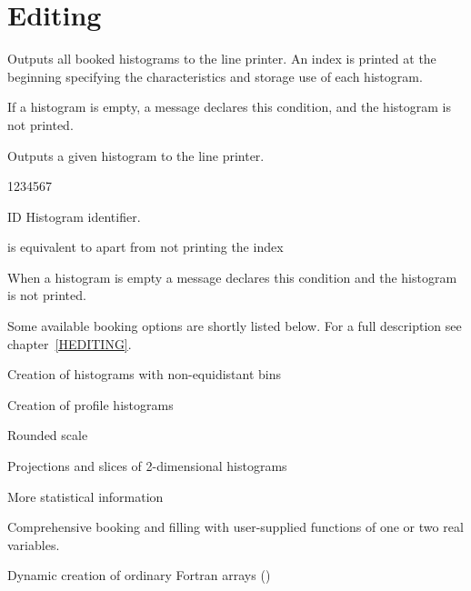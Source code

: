 \section{Editing}
\label{HEDITSEC}
 
 
\Action
Outputs all booked histograms to the line printer.
An index is printed at
the beginning specifying the characteristics and storage use of each
histogram.
 
\Remark
\begin{UL}
\item If a histogram is empty, a message declares this condition, and the
      histogram is not printed.
\end{UL}
 
 
\Action Outputs a given histogram to the line printer.
 
\begin{DLttc}{1234567}
\item[ID]  Histogram identifier.
\end{DLttc}
 
\Remarks
\begin{UL}
\item {} is equivalent to
       apart from not printing the index
\item When a histogram is empty a message declares this
      condition and the histogram is not printed.
\end{UL}
\medskip
Some available booking options are shortly listed below.
For a full description see chapter~\ref{HEDITING}.
 
\begin{UL}
\item Creation of histograms with non-equidistant bins
\item Creation of profile histograms
\item Rounded scale
\item Projections and slices of 2-dimensional histograms
\item More statistical information
\item Comprehensive booking and filling with
      user-supplied functions of one or two real variables.
\item Dynamic creation of ordinary Fortran arrays ()
\end{UL}
 


